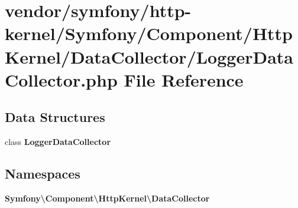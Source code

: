 \section{vendor/symfony/http-\/kernel/\+Symfony/\+Component/\+Http\+Kernel/\+Data\+Collector/\+Logger\+Data\+Collector.php File Reference}
\label{_logger_data_collector_8php}
\subsection*{Data Structures}
\begin{DoxyCompactItemize}
\item 
class {\bf Logger\+Data\+Collector}
\end{DoxyCompactItemize}
\subsection*{Namespaces}
\begin{DoxyCompactItemize}
\item 
 {\bf Symfony\textbackslash{}\+Component\textbackslash{}\+Http\+Kernel\textbackslash{}\+Data\+Collector}
\end{DoxyCompactItemize}
